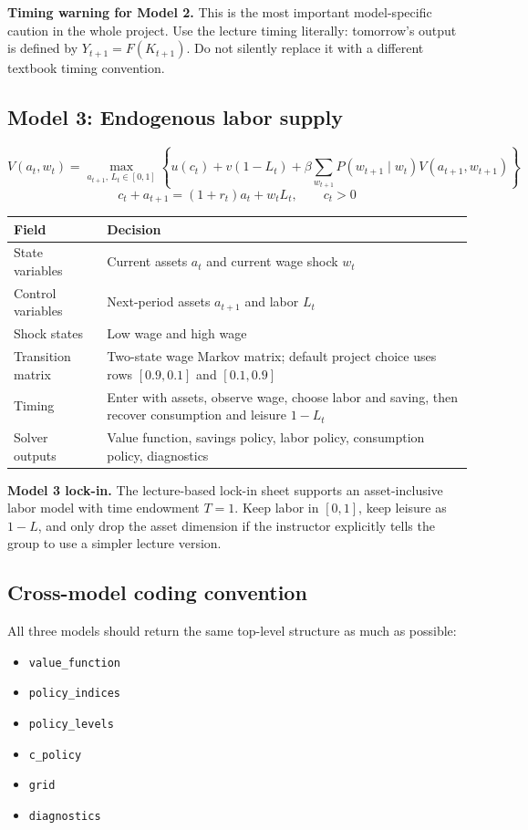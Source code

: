 \documentclass[11pt]{article}
\begin{document}
\begin{warningbox}
\textbf{Timing warning for Model 2.} This is the most important model-specific caution in the whole project. Use the lecture timing literally: tomorrow's output is defined by \(Y_{t+1}=F(K_{t+1})\). Do not silently replace it with a different textbook timing convention.
\end{warningbox}

\subsection{Model 3: Endogenous labor supply}
\[
V(a_t,w_t) = \max_{a_{t+1},\,L_t \in [0,1]}
\left\{
u(c_t) + v(1-L_t) + \beta \sum_{w_{t+1}} P(w_{t+1}\mid w_t)V(a_{t+1},w_{t+1})
\right\}
\]
\[
c_t + a_{t+1} = (1+r_t)a_t + w_tL_t, \qquad c_t>0
\]

\begin{tabularx}{\linewidth}{@{}p{3.1cm}X@{}}
\toprule
\textbf{Field} & \textbf{Decision} \\
\midrule
State variables & Current assets \(a_t\) and current wage shock \(w_t\) \\
Control variables & Next-period assets \(a_{t+1}\) and labor \(L_t\) \\
Shock states & Low wage and high wage \\
Transition matrix & Two-state wage Markov matrix; default project choice uses rows \([0.9, 0.1]\) and \([0.1, 0.9]\) \\
Timing & Enter with assets, observe wage, choose labor and saving, then recover consumption and leisure \(1-L_t\) \\
Solver outputs & Value function, savings policy, labor policy, consumption policy, diagnostics \\
\bottomrule
\end{tabularx}

\begin{warningbox}
\textbf{Model 3 lock-in.} The lecture-based lock-in sheet supports an asset-inclusive labor model with time endowment \(T=1\). Keep labor in \([0,1]\), keep leisure as \(1-L\), and only drop the asset dimension if the instructor explicitly tells the group to use a simpler lecture version.
\end{warningbox}

\subsection{Cross-model coding convention}
All three models should return the same top-level structure as much as possible:
\begin{itemize}
    \item \texttt{value\_function}
    \item \texttt{policy\_indices}
    \item \texttt{policy\_levels}
    \item \texttt{c\_policy}
    \item \texttt{grid}
    \item \texttt{diagnostics}
\end{itemize}
\end{document}
